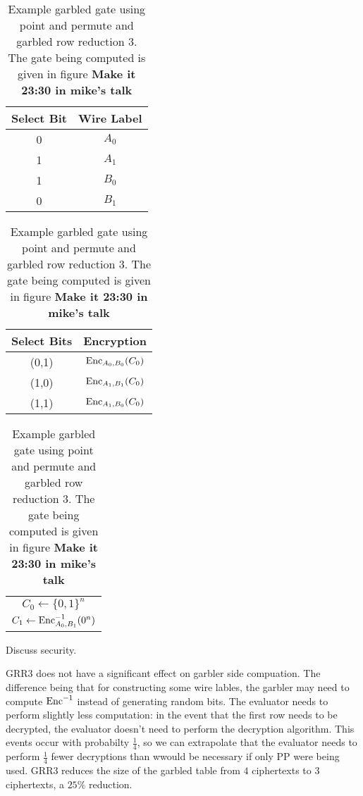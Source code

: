 \begin{table}[h]
    \centering
    \begin{tabular}{|c|c|}
    \hline
    Select Bit & Wire Label \\
    \hline
    0 & $A_0$ \\
    1 & $A_1$ \\
    1 & $B_0$ \\
    0 & $B_1$ \\
    \hline
    \end{tabular}
    \qquad
    \begin{tabular}{|c|c|}
    \hline
    Select Bits & Encryption \\
    \hline
    (0,1) & $\operatorname{Enc}_{A_0, B_0}(C_0)$ \\
    (1,0) & $\operatorname{Enc}_{A_1, B_1}(C_0)$ \\
    (1,1) & $\operatorname{Enc}_{A_1, B_0}(C_0)$ \\
    \hline
    \end{tabular}
    \qquad
    \begin{tabular}{|c|}
    \hline
    $C_0 \gets \{0,1\}^n$ \\
    $C_1 \gets \operatorname{Enc}_{A_0, B_1}^{-1}(0^n)$ \\
    \hline
    \end{tabular}
    \caption{Example garbled gate using point and permute and garbled row reduction 3. The gate being computed is given in figure \textbf{Make it 23:30 in mike's talk}}
\end{table}

Discuss security.

GRR3 does not have a significant effect on garbler side compuation.
The difference being that for constructing some wire lables, the garbler may need to compute $\operatorname{Enc}^{-1}$ instead of generating random bits. 
The evaluator needs to perform slightly less computation: in the event that the first row needs to be decrypted, the evaluator doesn't need to perform the decryption algorithm. 
This events occur with probabilty $\frac{1}{4}$, so we can extrapolate that the evaluator needs to perform $\frac{1}{4}$ fewer decryptions than wwould be necessary if only PP were being used.
GRR3 reduces the size of the garbled table from $4$ ciphertexts to $3$ ciphertexts, a $25\%$ reduction.

